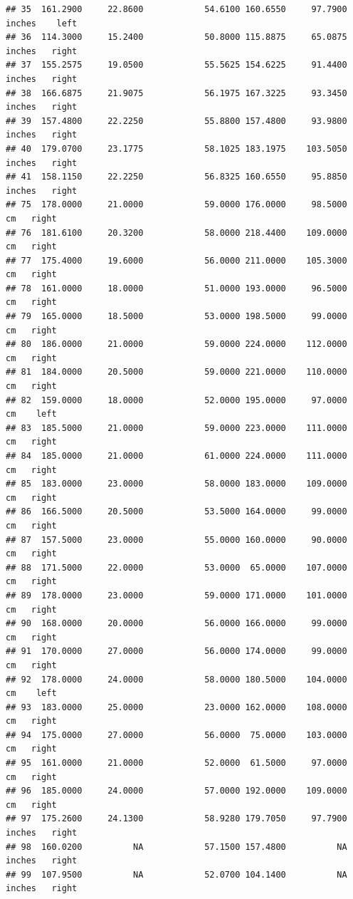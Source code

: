 \documentclass[]{article}
\begin{document}
\begin{verbatim}
## 35  161.2900     22.8600            54.6100 160.6550     97.7900 inches    left
## 36  114.3000     15.2400            50.8000 115.8875     65.0875 inches   right
## 37  155.2575     19.0500            55.5625 154.6225     91.4400 inches   right
## 38  166.6875     21.9075            56.1975 167.3225     93.3450 inches   right
## 39  157.4800     22.2250            55.8800 157.4800     93.9800 inches   right
## 40  179.0700     23.1775            58.1025 183.1975    103.5050 inches   right
## 41  158.1150     22.2250            56.8325 160.6550     95.8850 inches   right
## 75  178.0000     21.0000            59.0000 176.0000     98.5000     cm   right
## 76  181.6100     20.3200            58.0000 218.4400    109.0000     cm   right
## 77  175.4000     19.6000            56.0000 211.0000    105.3000     cm   right
## 78  161.0000     18.0000            51.0000 193.0000     96.5000     cm   right
## 79  165.0000     18.5000            53.0000 198.5000     99.0000     cm   right
## 80  186.0000     21.0000            59.0000 224.0000    112.0000     cm   right
## 81  184.0000     20.5000            59.0000 221.0000    110.0000     cm   right
## 82  159.0000     18.0000            52.0000 195.0000     97.0000     cm    left
## 83  185.5000     21.0000            59.0000 223.0000    111.0000     cm   right
## 84  185.0000     21.0000            61.0000 224.0000    111.0000     cm   right
## 85  183.0000     23.0000            58.0000 183.0000    109.0000     cm   right
## 86  166.5000     20.5000            53.5000 164.0000     99.0000     cm   right
## 87  157.5000     23.0000            55.0000 160.0000     90.0000     cm   right
## 88  171.5000     22.0000            53.0000  65.0000    107.0000     cm   right
## 89  178.0000     23.0000            59.0000 171.0000    101.0000     cm   right
## 90  168.0000     20.0000            56.0000 166.0000     99.0000     cm   right
## 91  170.0000     27.0000            56.0000 174.0000     99.0000     cm   right
## 92  178.0000     24.0000            58.0000 180.5000    104.0000     cm    left
## 93  183.0000     25.0000            23.0000 162.0000    108.0000     cm   right
## 94  175.0000     27.0000            56.0000  75.0000    103.0000     cm   right
## 95  161.0000     21.0000            52.0000  61.5000     97.0000     cm   right
## 96  185.0000     24.0000            57.0000 192.0000    109.0000     cm   right
## 97  175.2600     24.1300            58.9280 179.7050     97.7900 inches   right
## 98  160.0200          NA            57.1500 157.4800          NA inches   right
## 99  107.9500          NA            52.0700 104.1400          NA inches   right

\end{verbatim}
\end{document}
